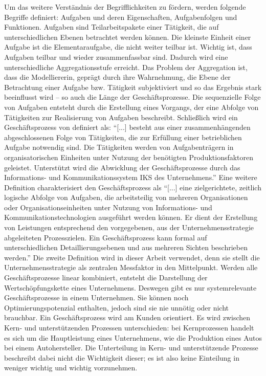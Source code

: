 Um das weitere Verständnis der Begrifflichkeiten zu fördern, werden folgende Begriffe definiert\autocite[vgl.][S.\,4-5]{staud_geschaftsprozessanalyse_2006}: Aufgaben und deren Eigenschaften, Aufgabenfolgen und Funktionen. Aufgaben sind Teilarbeitspakete einer Tätigkeit, die auf unterschiedlichen Ebenen betrachtet werden können. Die kleinste Einheit einer Aufgabe ist die Elementaraufgabe, die nicht weiter teilbar ist. Wichtig ist, dass Aufgaben teilbar und wieder zusammenfassbar sind. Dadurch wird eine unterschiedliche Aggregationsstufe erreicht. Das Problem der Aggregation ist, dass die Modelliererin, geprägt durch ihre Wahrnehmung, die Ebene der Betrachtung einer Aufgabe bzw. Tätigkeit subjektiviert und so das Ergebnis stark beeinflusst wird -- so auch die Länge der Geschäftsprozesse. Die sequenzielle Folge von Aufgaben entsteht durch die Erstellung eines Vorgangs, der eine Abfolge von Tätigkeiten zur Realisierung von Aufgaben beschreibt. Schließlich wird ein Geschäftsprozess von \cite{staud_geschaftsprozessanalyse_2006} definiert als: \enquote{[...] besteht aus einer zusammenhängenden abgeschlossenen Folge von Tätigkeiten, die zur Erfüllung einer betrieblichen Aufgabe notwendig sind. Die Tätigkeiten werden von Aufgabenträgern in organisatorischen Einheiten unter Nutzung der benötigten Produktionsfaktoren geleistet. Unterstützt wird die Abwicklung der Geschäftsprozesse durch das Informations- und Kommunikationssystem IKS des Unternehmens.}\autocite[][S.\,9]{staud_geschaftsprozessanalyse_2006} Eine weitere Definition charakterisiert den Geschäftsprozess als \enquote{[...] eine zielgerichtete, zeitlich logische Abfolge von Aufgaben, die arbeitsteilig von mehreren Organisationen oder Organisationseinheiten unter Nutzung von Informations- und Kommunikationstechnologien ausgeführt werden können. Er dient der Erstellung von Leistungen entsprechend den vorgegebenen, aus der Unternehmensstrategie abgeleiteten Prozesszielen. Ein Geschäftsprozess kann formal auf unterschiedlichen Detaillierungsebenen und aus mehreren Sichten beschrieben werden.}\autocite[][S.\,41]{gadatsch_grundkurs_2010} Die zweite Definition wird in dieser Arbeit verwendet, denn sie stellt die Unternehmensstrategie als zentralen Messfaktor in den Mittelpunkt. Werden alle Geschäftsprozesse linear kombiniert, entsteht die Darstellung der Wertschöpfungskette eines Unternehmens. Deswegen gibt es nur systemrelevante Geschäftsprozesse in einem Unternehmen. Sie können noch Optimierungspotenzial enthalten, jedoch sind sie nie unnötig oder nicht brauchbar. Ein Geschäftsprozess wird am Kunden orientiert. Es wird zwischen Kern- und unterstützenden Prozessen unterschieden: bei Kernprozessen handelt es sich um die Hauptleistung eines Unternehmens, wie die Produktion eines Autos bei einem Autohersteller. Die Unterteilung in Kern- und unterstützende Prozesse beschreibt dabei nicht die Wichtigkeit dieser; es ist also keine Einteilung in weniger wichtig und wichtig vorzunehmen.\autocite[vgl.][S.\,11]{staud_geschaftsprozessanalyse_2006} \par

